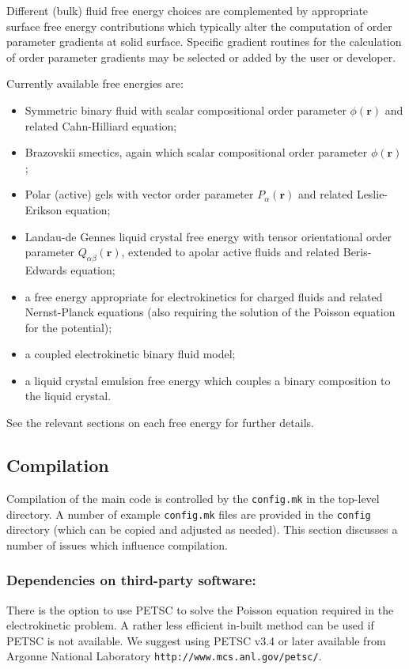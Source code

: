 Different (bulk) fluid free energy choices are complemented by
appropriate surface free energy contributions which typically
alter the computation of order parameter gradients at solid
surface. Specific gradient routines for the calculation of
order parameter gradients may be selected or added by the
user or developer.

Currently available free energies are:
\begin{itemize}
\item Symmetric binary fluid with scalar compositional order parameter
$\phi(\mathbf{r})$ and related Cahn-Hilliard equation;
\item Brazovskii smectics, again which scalar compositional order parameter
$\phi(\mathbf{r})$;
\item Polar (active) gels with vector order parameter $P_\alpha (\mathbf{r})$
and related Leslie-Erikson equation;
\item Landau-de Gennes liquid crystal free energy with tensor
orientational order parameter $Q_{\alpha\beta}(\mathbf{r})$, extended to
apolar active fluids and related Beris-Edwards equation;
\item a free energy appropriate for electrokinetics for charged fluids
and related Nernst-Planck equations (also requiring the solution of the
Poisson equation for the potential);
\item a coupled electrokinetic binary fluid model;
\item a liquid crystal emulsion free energy which couples a binary
composition to the liquid crystal.
\end{itemize}
See the relevant sections on each free energy for further details.

\subsection{Compilation}

Compilation of the main code is controlled by the \texttt{config.mk} in
the  top-level directory. A number of example \texttt{config.mk} files
are provided in the \texttt{config} directory (which can be copied and
adjusted as needed). This section discusses a number of issues
which influence compilation.

\subsubsection{Dependencies on third-party software:}
There is the option to use PETSC to solve the Poisson equation required in
the electrokinetic problem. A rather less efficient in-built method
can be used if PETSC is not available.
We suggest using PETSC
v3.4 or later available from Argonne National Laboratory
\texttt{http://www.mcs.anl.gov/petsc/}.

